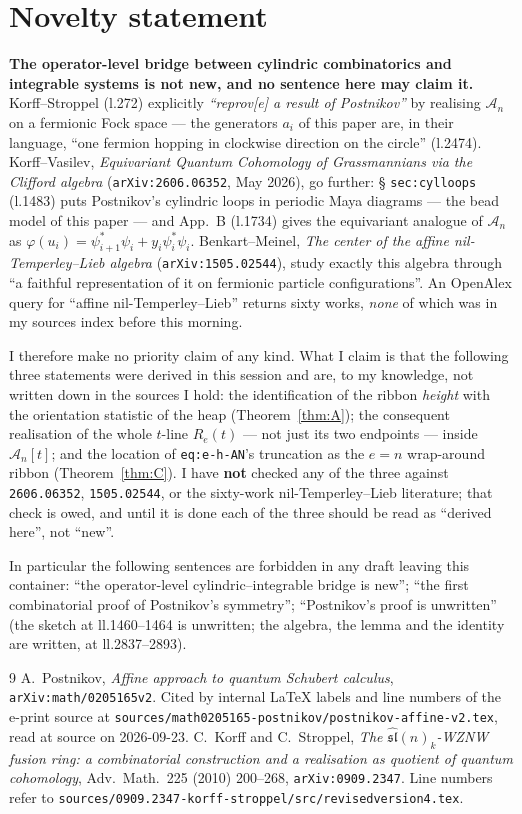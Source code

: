 \documentclass[11pt]{article}
\theoremstyle{plain}
\theoremstyle{definition}
\newcommand{\A}{\mathscr{A}}
\begin{document}
\section*{Novelty statement}

\textbf{The operator-level bridge between cylindric combinatorics and
integrable systems is not new, and no sentence here may claim it.}
Korff--Stroppel \cite{KS} (l.272) explicitly \emph{``reprov[e] a result of
Postnikov''} by realising $\A_n$ on a fermionic Fock space --- the
generators $a_i$ of this paper are, in their language, ``one fermion
hopping in clockwise direction on the circle'' (l.2474).  Korff--Vasilev,
\emph{Equivariant Quantum Cohomology of Grassmannians via the Clifford
algebra} (\texttt{arXiv:2606.06352}, May 2026), go further: \S
\texttt{sec:cylloops} (l.1483) puts Postnikov's cylindric loops in
periodic Maya diagrams --- the bead model of this paper --- and App.~B
(l.1734) gives the equivariant analogue of $\A_n$ as
$\varphi(u_i)=\psi^*_{i+1}\psi_i+y_i\psi^*_i\psi_i$.  Benkart--Meinel,
\emph{The center of the affine nil-Temperley--Lieb algebra}
(\texttt{arXiv:1505.02544}), study exactly this algebra through ``a
faithful representation of it on fermionic particle configurations''.
An OpenAlex query for ``affine nil-Temperley--Lieb'' returns sixty works,
\emph{none} of which was in my sources index before this morning.

I therefore make no priority claim of any kind.  What I claim is that
the following three statements were derived in this session and are, to
my knowledge, not written down in the sources I hold: the identification
of the ribbon \emph{height} with the orientation statistic of the heap
(Theorem~\ref{thm:A}); the consequent realisation of the whole $t$-line
$R_e(t)$ --- not just its two endpoints --- inside $\A_n[t]$; and the
location of \texttt{eq:e-h-AN}'s truncation as the $e=n$ wrap-around
ribbon (Theorem~\ref{thm:C}).  I have \textbf{not} checked any of the
three against \texttt{2606.06352}, \texttt{1505.02544}, or the sixty-work
nil-Temperley--Lieb literature; that check is owed, and until it is done
each of the three should be read as ``derived here'', not ``new''.

In particular the following sentences are forbidden in any draft leaving
this container: ``the operator-level cylindric--integrable bridge is
new''; ``the first combinatorial proof of Postnikov's symmetry'';
``Postnikov's proof is unwritten'' (the sketch at ll.1460--1464 is
unwritten; the algebra, the lemma and the identity are written, at
ll.2837--2893).

\begin{thebibliography}{9}
 A.~Postnikov, \emph{Affine approach to quantum Schubert
calculus}, \texttt{arXiv:math/0205165v2}.  Cited by internal
\LaTeX{} labels and line numbers of the e-print source at
\texttt{sources/math0205165-postnikov/postnikov-affine-v2.tex},
read at source on 2026-09-23.
 C.~Korff and C.~Stroppel, \emph{The
$\widehat{\mathfrak{sl}}(n)_k$-WZNW fusion ring: a combinatorial
construction and a realisation as quotient of quantum cohomology},
Adv.\ Math.\ 225 (2010) 200--268, \texttt{arXiv:0909.2347}.  Line
numbers refer to
\texttt{sources/0909.2347-korff-stroppel/src/revisedversion4.tex}.
\end{thebibliography}
\end{document}
